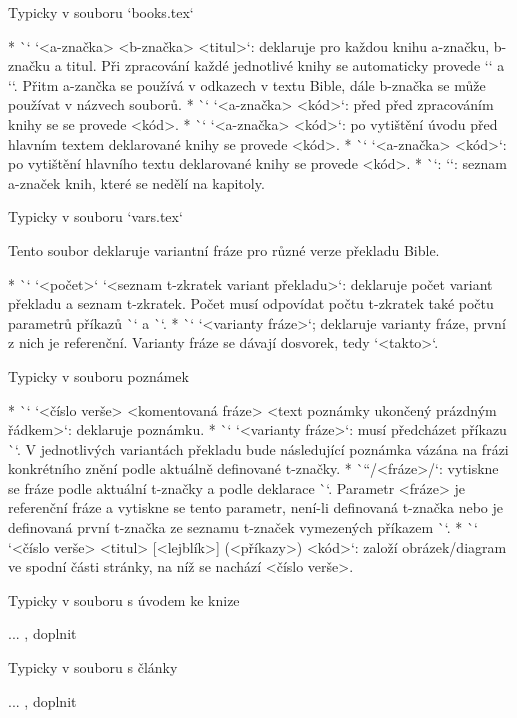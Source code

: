 \secc Typicky v souboru `books.tex`

\begitems
* \`\BookTitle` `<a-značka> <b-značka> <titul>`: deklaruje pro každou knihu
  a-značku, b-značku a titul. Při zpracování každé jednotlivé knihy se automaticky provede
  `\def\amark{<a-značka>}` a `\def\bmark{b-značka}`. Přitm a-zančka se používá v
  odkazech v textu Bible, dále b-značka se může používat v názvech souborů.
* \`\BookException` `<a-značka> {<kód>}`: před před zpracováním knihy se
  se provede <kód>.
* \`\BookPre` `<a-značka> {<kód>}`: po vytištění úvodu před hlavním textem
  deklarované knihy se provede <kód>.
* \`\BookPost` `<a-značka> {<kód>}`: po vytištění hlavního textu
  deklarované knihy se provede <kód>.
* \`\nochapbooks`: `\def\nochapbooks{<seznam>}`: seznam a-značek knih, které
  se nedělí na kapitoly.
\enditems

\secc Typicky v souboru `vars.tex`

Tento soubor deklaruje variantní fráze pro různé verze překladu Bible.

\begitems
* \`\variants` `<počet>` `<seznam t-zkratek variant překladu>`: deklaruje počet
  variant překladu a seznam \hbox{t-zkratek}. Počet musí odpovídat počtu
  t-zkratek také počtu parametrů příkazů \`\vdef` a \`\ww`.
* \`\vdef` `<varianty fráze>`; deklaruje varianty fráze, první z nich je
  referenční. Varianty fráze se dávají dosvorek, tedy `{<takto>}`.
\enditems

\secc Typicky v souboru poznámek

\begitems
* \`\Note` `<číslo verše> {<komentovaná fráze>} <text poznámky ukončený prázdným řádkem>`:
  deklaruje poznámku.
* \`\ww` `<varianty fráze>`: musí předcházet příkazu \`\Note`. V
  jednotlivých variantách překladu bude následující poznámka vázána na frázi
  konkrétního znění podle aktuálně definované t-značky.
* \`\x``/<fráze>/`: vytiskne se fráze podle aktuální t-značky a podle
  deklarace \`\vdef`. Parametr <fráze> je referenční fráze a vytiskne se
  tento parametr, není-li definovaná t-značka nebo je definovaná první
  t-značka ze seznamu t-značek vymezených příkazem \`\variants`.
* \`\putBot` `<číslo verše> {<titul>} [<lejblík>] (<příkazy>) {<kód>}`:
  založí obrázek/diagram ve spodní části stránky, na níž se nachází <číslo verše>.
\enditems

\secc Typicky v souboru s úvodem ke knize

... \TODO, doplnit

\secc Typicky v souboru s články

... \TODO, doplnit


